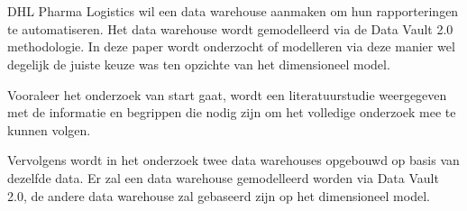 
%
%

%



\chapter*{}

DHL Pharma Logistics wil een data warehouse aanmaken om hun rapporteringen te automatiseren. Het data warehouse wordt gemodelleerd via de Data Vault 2.0 methodologie. In deze paper wordt onderzocht of modelleren via deze manier wel degelijk de juiste keuze was ten opzichte van het dimensioneel model. 

Vooraleer het onderzoek van start gaat, wordt een literatuurstudie weergegeven met de informatie en begrippen die nodig zijn om het volledige onderzoek mee te kunnen volgen.

Vervolgens wordt in het onderzoek twee data warehouses opgebouwd op basis van dezelfde data. Er zal een data warehouse gemodelleerd worden via Data Vault 2.0, de andere data warehouse zal gebaseerd zijn op het dimensioneel model.

